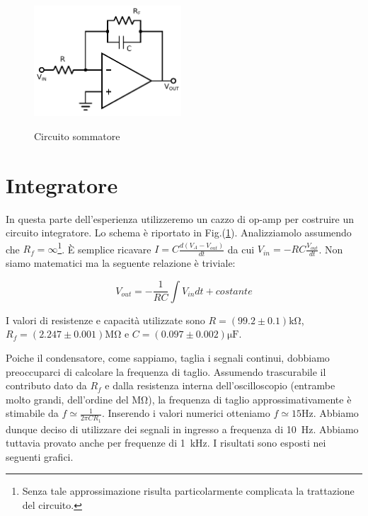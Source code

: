 \begin{figure}
	\caption{Circuito sommatore}
	\includegraphics[width=55mm]{ccint.pdf}
	\label{fig:ccsum}
\end{figure}

\section{Integratore}

In questa parte dell'esperienza utilizzeremo un cazzo di op-amp per costruire un circuito integratore. Lo schema è riportato in Fig.(\ref{}). Analizziamolo assumendo che $R_f=\infty$\footnote{Senza tale approssimazione risulta particolarmente complicata la trattazione del circuito.}. È semplice ricavare $I=C\frac{d(V_A-V_{out})}{dt}$ da cui $V_{in}=-RC\frac{V_{out}}{dt}$. Non siamo matematici ma la seguente relazione è triviale:

$$V_{out}=-\frac{1}{RC} \int V_{in}dt +costante$$

I valori di resistenze e capacità utilizzate sono $R=(99.2 \pm 0.1)\si{\kilo\ohm}$, $R_f=(2.247 \pm 0.001)\si{\mega\ohm}$ e $C=(0.097 \pm 0.002) \si{\micro\farad}$. 

Poiche il condensatore, come sappiamo, taglia i segnali continui, dobbiamo preoccuparci di calcolare la frequenza di taglio. Assumendo trascurabile il contributo dato da $R_f$ e dalla resistenza interna dell'oscilloscopio (entrambe molto grandi, dell'ordine del $\si{\mega\ohm}$), la frequenza di taglio approssimativamente è stimabile da $f\simeq \frac{1}{2\pi C R_1}$. Inserendo i valori numerici otteniamo $f \simeq 15 \si{\hertz}$. Abbiamo dunque deciso di utilizzare dei segnali in ingresso a frequenza di \SI{10}{\hertz}. Abbiamo tuttavia provato anche per frequenze di \SI{1}{\kilo\hertz}. I risultati sono esposti nei seguenti grafici.
